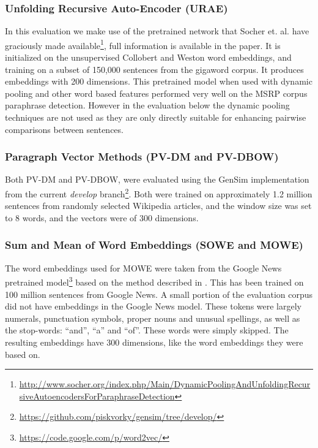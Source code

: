 \documentclass[]{book}
\begin{document}
\subsubsection{Unfolding Recursive Auto-Encoder (URAE)}

In this evaluation we make use of the pretrained network that Socher
et. al. have graciously made available\footnote{\href{http://www.socher.org/index.php/Main/DynamicPoolingAndUnfoldingRecursiveAutoencodersForParaphraseDetection}{http://www.socher.org/index.php/Main/DynamicPoolingAndUnfoldingRecursiveAutoencodersForParaphraseDetection}},
full information is available in the paper\cite{SocherEtAl2011:PoolRAE}.
It is initialized on the unsupervised Collobert and Weston word embeddings\cite{collobert2008unified},
and training on a subset of 150,000 sentences from the gigaword corpus.
It produces embeddings with 200 dimensions. This pretrained model
when used with dynamic pooling and other word based features performed
very well on the MSRP corpus paraphrase detection. However in the
evaluation below the dynamic pooling techniques are not used as they
are only directly suitable for enhancing pairwise comparisons between
sentences.


\subsubsection{Paragraph Vector Methods (PV-DM and PV-DBOW)}

Both PV-DM and PV-DBOW, were evaluated using the GenSim implementation
\cite{rehurek_lrec} from the current \emph{develop} branch\footnote{\href{https://github.com/piskvorky/gensim/tree/develop/}{https://github.com/piskvorky/gensim/tree/develop/}}.
Both were trained on approximately 1.2 million sentences from randomly
selected Wikipedia articles, and the window size was set to 8 words,
and the vectors were of 300 dimensions.


\subsubsection{Sum and Mean of Word Embeddings (SOWE and MOWE)}

The word embeddings used for MOWE were taken from the Google News
pretrained model\footnote{\href{https://code.google.com/p/word2vec/}{https://code.google.com/p/word2vec/}}
based on the method described in \cite{mikolovSkip}. This has been
trained on 100 million sentences from Google News. A small portion
of the evaluation corpus did not have embeddings in the Google News
model. These tokens were largely numerals, punctuation symbols, proper
nouns and unusual spellings, as well as the stop-words: ``and'',
``a'' and ``of''. These words were simply skipped. The resulting
embeddings have 300 dimensions, like the word embeddings they were
based on.
\end{document}
